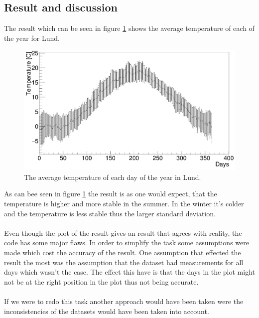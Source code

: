 \documentclass[../main.tex]{subfiles}
\begin{document}
\subsection{Result and discussion}
The result which can be seen in figure \ref{avgtemp} shows the average temperature of each of the year for Lund.

\begin{figure}[H]
\includegraphics[scale = 0.2]{avg_temp.png}
\caption{The average temperature of each day of the year in Lund.}
\label{avgtemp}
\end{figure}\noindent
As can bee seen in figure \ref{avgtemp} the result is as one would expect, that the temperature is higher and more stable in the summer. In the winter it's colder and the temperature is less stable thus the larger standard deviation.
\\\\
Even though the plot of the result gives an result that agrees with reality, the code has some major flaws. In order to simplify the task some assumptions were made which cost the accuracy of the result. One assumption that effected the result the most was the assumption that the dataset had measurements for all days which wasn't the case. The effect this have is that the days in the plot might not be at the right position in the plot thus not being accurate.
\\\\
If we were to redo this task another approach would have been taken were the inconsistencies of the datasets would have been taken into account.
\end{document}
